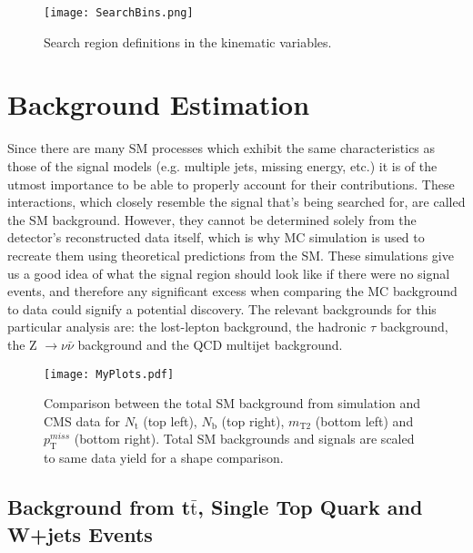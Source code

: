 \begin{figure}[tb]
\begin{center}
\texttt{[image: SearchBins.png]} 
\caption{Search region definitions in the kinematic variables.}
\label{SearchBins.png} 
\end{center}
\end{figure}

\section{Background Estimation}

Since there are many SM processes which exhibit the same characteristics as those of the signal models (e.g. multiple jets, missing energy, etc.) it is of the utmost importance to be able to properly account for their contributions. These interactions, which closely resemble the signal that's being searched for, are called the SM background. However, they cannot be determined solely from the detector's reconstructed data itself, which is why MC simulation is used to recreate them using theoretical predictions from the SM. These simulations give us a good idea of what the signal region should look like if there were no signal events, and therefore any significant excess when comparing the MC background to data could signify a potential discovery. The relevant backgrounds for this particular analysis are: the lost-lepton background, the hadronic $\tau$ background, the Z $\rightarrow\nu \bar{\nu}$ background and the QCD multijet background.

\begin{figure}[tb]
\begin{center}
\texttt{[image: MyPlots.pdf]} 
\caption{Comparison between the total SM background from simulation and CMS data for $N_\text{t}$ (top left), $N_\text{b}$ (top right),  $m_\text{T2}$ (bottom left) and $p_{\text{T}}^{miss}$ (bottom right). Total SM backgrounds and signals are scaled to same data yield for a shape comparison.}
\label{MyPlots.pdf} 
\end{center}
\end{figure}

\subsection{Background from t$\bar{\text{t}}$, Single Top Quark and W+jets Events}

